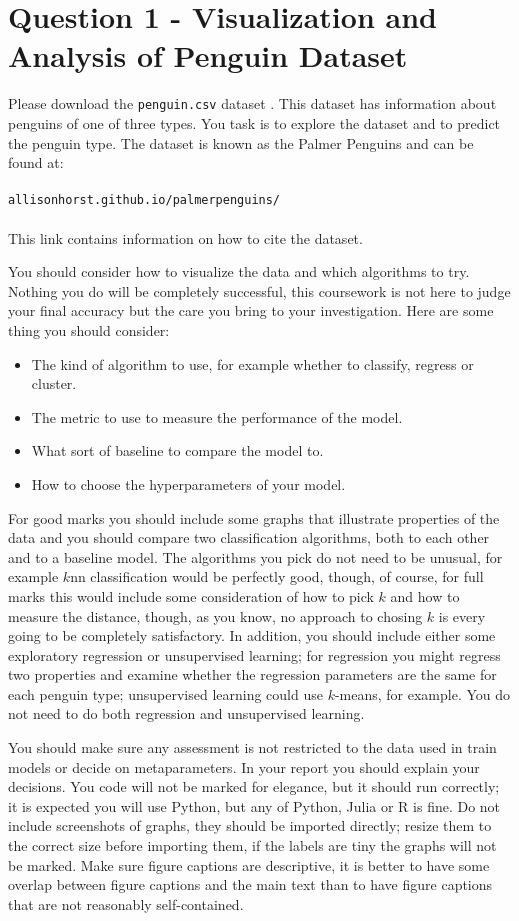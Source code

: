 \documentclass[12pt]{article}
\begin{document}
\section*{Question 1 - Visualization and Analysis of Penguin Dataset}

Please download the \texttt{penguin.csv} dataset \cite{PM}. This dataset has
information about penguins of one of three types. You task is to
explore the dataset and to predict the penguin type. The dataset is
known as the Palmer Penguins and can be found at:\\
\\
\texttt{allisonhorst.github.io/palmerpenguins/}\\
\\
This link contains information on how to cite the dataset.

You should consider how to visualize the data and which algorithms to
try. Nothing you do will be completely successful, this coursework is
not here to judge your final accuracy but the care you bring to your
investigation. Here are some thing you should consider:
\begin{itemize}
  \item The kind of algorithm to use, for example whether to classify, regress  or cluster.
  \item The metric to use to measure the performance of the model.
  \item What sort of baseline to compare the model to.
  \item How to choose the hyperparameters of your model.
\end{itemize}
For good marks you should include some graphs that illustrate
properties of the data and you should compare two classification
algorithms, both to each other and to a baseline model. The algorithms
you pick do not need to be unusual, for example $k$nn classification
would be perfectly good, though, of course, for full marks this would
include some consideration of how to pick $k$ and how to measure the
distance, though, as you know, no approach to chosing $k$ is every
going to be completely satisfactory. In addition, you should include
either some exploratory regression or unsupervised learning; for
regression you might regress two properties and examine whether the
regression parameters are the same for each penguin type; unsupervised
learning could use $k$-means, for example. You do not need to do both
regression and unsupervised learning.

You should make sure any assessment is not restricted to the data used
in train models or decide on metaparameters. In your report you should
explain your decisions. You code will not be marked for elegance, but
it should run correctly; it is expected you will use Python, but any
of Python, Julia or R is fine. Do not include screenshots of graphs,
they should be imported directly; resize them to the correct size
before importing them, if the labels are tiny the graphs will not be
marked. Make sure figure captions are descriptive, it is better to
have some overlap between figure captions and the main text than to
have figure captions that are not reasonably self-contained.
\end{document}
